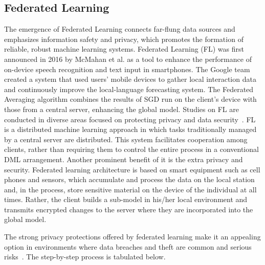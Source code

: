\subsection{Federated Learning}
The emergence of Federated Learning connects far-flung data sources and emphasizes information safety and privacy, which promotes the formation of reliable, robust machine learning systems. Federated Learning (FL) was first announced in 2016 by McMahan et al. as a tool to enhance the performance of on-device speech recognition and text input in smartphones. The Google team created a system that used users' mobile devices to gather local interaction data and continuously improve the local-language forecasting system. The Federated Averaging algorithm combines the results of SGD run on the client's device with those from a central server, enhancing the global model. Studies on FL are conducted in diverse areas focused on protecting privacy and data security~\cite{ref9}. FL is a distributed machine learning approach in which tasks traditionally managed by a central server are distributed. This system facilitates cooperation among clients, rather than requiring them to control the entire process in a conventional DML arrangement. Another prominent benefit of it is the extra privacy and security. Federated learning architecture is based on smart equipment such as cell phones and sensors, which accumulate and process the data on the local station and, in the process, store sensitive material on the device of the individual at all times. Rather, the client builds a sub-model in his/her local environment and transmits encrypted changes to the server where they are incorporated into the global model.

The strong privacy protections offered by federated learning make it an appealing option in environments where data breaches and theft are common and serious risks~\cite{ref10}. The step-by-step process is tabulated below.

